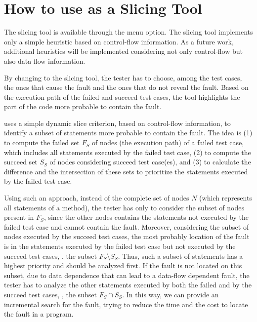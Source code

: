 
\section{How to use \toolname as a Slicing Tool}\label{sec:slice}

The \toolname slicing tool is available through the  menu option. The slicing tool
implements only a simple heuristic based on control-flow
information. As a future work, additional heuristics will be
implemented considering not only control-flow but also data-flow
information.

By changing to the slicing tool, the tester has to choose, among
the test cases, the ones that cause the fault and the ones that do
not reveal the fault. Based on the execution path of the failed
and succeed test cases, the tool highlights the part of the code
more probable to contain the fault.

\toolname uses a simple dynamic slice criterion, based on
control-flow information, to identify a subset of statements more
probable to contain the fault. The idea is (1) to compute the
failed set $F_S$ of \BG nodes (the execution path) of a failed
test case, which includes all statements executed by the failed
test case, (2) to compute the succeed set $S_S$ of \BG nodes
considering succeed test case(es), and (3) to calculate the
difference and the intersection of these sets to prioritize the
statements executed by the failed test case.

Using such an approach, instead of the complete set of \BG nodes
$N$ (which represents all statements of a method), the tester has
only to consider the subset of \BG nodes present in $F_S$, since
the other \BG nodes contains the statements not executed by the
failed test case and cannot contain the fault. Moreover,
considering the subset of nodes executed by the succeed test
cases, the most probably location of the fault is in the
statements executed by the failed test case but not executed by
the succeed test cases, \ie, the subset $F_S \setminus S_S$. Thus,
such a subset of statements has a highest priority and should be
analyzed first. If the fault is not located on this subset, due to
data dependence that can lead to a data-flow dependent fault, the
tester has to analyze the other statements executed by both the
failed and by the succeed test cases, \ie, the subset $F_S \cap
S_S$. In this way, we can provide an incremental search for the
fault, trying to reduce the time and the cost to locate the fault
in a program.

